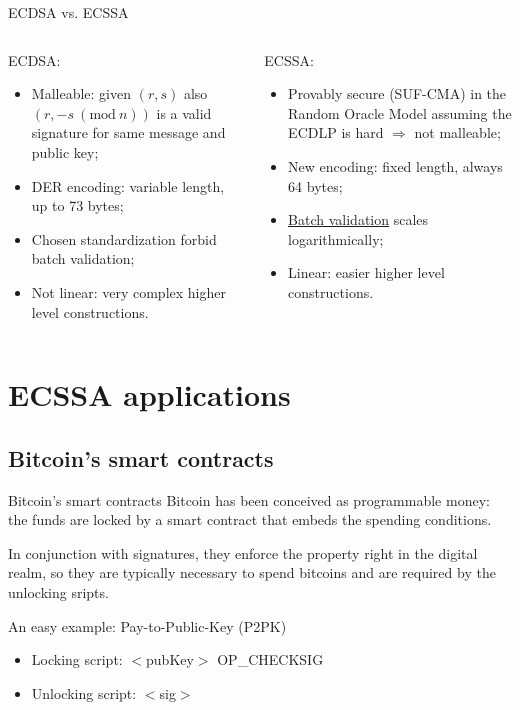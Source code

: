 \documentclass[slidescentered]{beamer}
\begin{document}
	\begin{frame}{ECDSA vs. ECSSA}
		\begin{columns}
			\begin{column}{0.5\linewidth}
				ECDSA:
				\begin{itemize}
					\item<2 -> Malleable: given $(r, s)$ also $(r, -s \ (\text{mod} \ n))$ is a valid signature for same message and public key;
					\item<3 -> DER encoding: variable length, up to 73 bytes;
					\item<4 -> Chosen standardization forbid batch validation;
					\item<5 -> Not linear: very complex higher level constructions.
				\end{itemize}
			\end{column}
			\begin{column}{0.5\linewidth}
				ECSSA:
				\begin{itemize}
					\item<2 -> Provably secure (SUF-CMA) in the Random Oracle Model assuming the ECDLP is hard $\Longrightarrow$ not malleable;
					\item<3 -> New encoding: fixed length, always 64 bytes;
					\item<4 -> \hyperlink{batch_validation}{Batch validation} scales logarithmically;
					\item<5 -> Linear: easier higher level constructions.
				\end{itemize}
			\end{column}
		\end{columns}
	\end{frame}
	
	\section{ECSSA applications}
	
	\subsection{Bitcoin's smart contracts}
	\begin{frame}{Bitcoin's smart contracts}
		Bitcoin has been conceived as programmable money: the funds are locked by a smart contract that embeds the spending conditions.
		
		\bigskip
		\noindent
		In conjunction with signatures, they enforce the property right in the digital realm, so they are typically necessary to spend bitcoins and are required by the unlocking sripts.
		
		\bigskip
		\noindent
		\begin{block}{An easy example: Pay-to-Public-Key (P2PK)}
			\begin{itemize}
				\item Locking script: $<$pubKey$>$ OP\_CHECKSIG
				\item Unlocking script: $<$sig$>$
			\end{itemize}
		\end{block}
	\end{frame}
	
\end{document}
